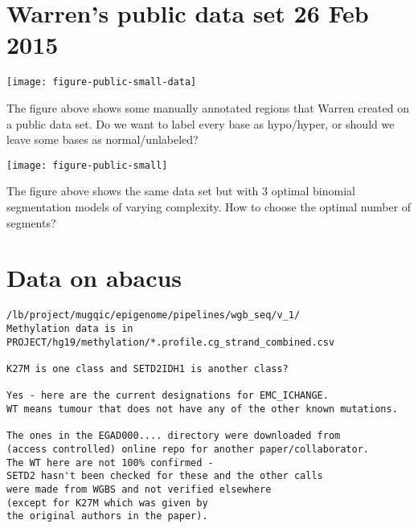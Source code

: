 \documentclass[12pt]{article}
\begin{document}
\section{Warren's public data set 26 Feb 2015}

\texttt{[image: figure-public-small-data]}

The figure above shows some manually annotated regions that Warren
created on a public data set. Do we want to label every base as
hypo/hyper, or should we leave some bases as normal/unlabeled?

\texttt{[image: figure-public-small]}

The figure above shows the same data set but with 3 optimal binomial
segmentation models of varying complexity. How to choose the optimal
number of segments?

\section{Data on abacus}

\begin{verbatim}
/lb/project/mugqic/epigenome/pipelines/wgb_seq/v_1/
Methylation data is in 
PROJECT/hg19/methylation/*.profile.cg_strand_combined.csv

K27M is one class and SETD2IDH1 is another class?

Yes - here are the current designations for EMC_ICHANGE.  
WT means tumour that does not have any of the other known mutations.

The ones in the EGAD000.... directory were downloaded from 
(access controlled) online repo for another paper/collaborator.  
The WT here are not 100% confirmed - 
SETD2 hasn't been checked for these and the other calls 
were made from WGBS and not verified elsewhere
(except for K27M which was given by
the original authors in the paper).
\end{verbatim}






\end{document}
